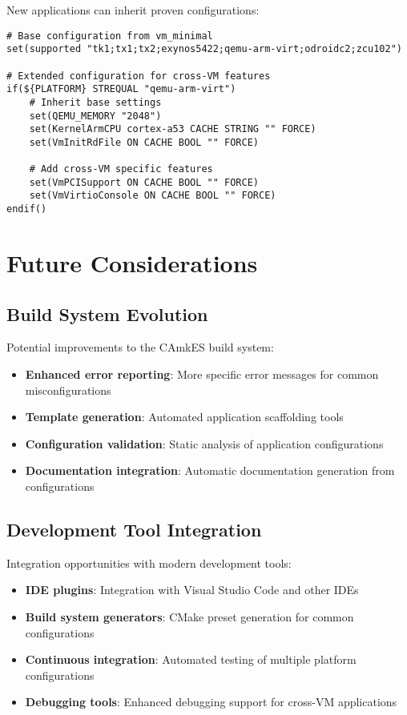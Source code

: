 \documentclass[12pt,a4paper]{article}
\begin{document}
New applications can inherit proven configurations:

\begin{lstlisting}[style=cmake, caption=Configuration inheritance pattern]
# Base configuration from vm_minimal
set(supported "tk1;tx1;tx2;exynos5422;qemu-arm-virt;odroidc2;zcu102")

# Extended configuration for cross-VM features  
if(${PLATFORM} STREQUAL "qemu-arm-virt")
    # Inherit base settings
    set(QEMU_MEMORY "2048")
    set(KernelArmCPU cortex-a53 CACHE STRING "" FORCE)
    set(VmInitRdFile ON CACHE BOOL "" FORCE)
    
    # Add cross-VM specific features
    set(VmPCISupport ON CACHE BOOL "" FORCE)
    set(VmVirtioConsole ON CACHE BOOL "" FORCE)
endif()
\end{lstlisting}

\section{Future Considerations}

\subsection{Build System Evolution}

Potential improvements to the CAmkES build system:

\begin{itemize}
\item \textbf{Enhanced error reporting}: More specific error messages for common misconfigurations
\item \textbf{Template generation}: Automated application scaffolding tools
\item \textbf{Configuration validation}: Static analysis of application configurations
\item \textbf{Documentation integration}: Automatic documentation generation from configurations
\end{itemize}

\subsection{Development Tool Integration}

Integration opportunities with modern development tools:

\begin{itemize}
\item \textbf{IDE plugins}: Integration with Visual Studio Code and other IDEs
\item \textbf{Build system generators}: CMake preset generation for common configurations
\item \textbf{Continuous integration}: Automated testing of multiple platform configurations
\item \textbf{Debugging tools}: Enhanced debugging support for cross-VM applications
\end{itemize}
\end{document}
